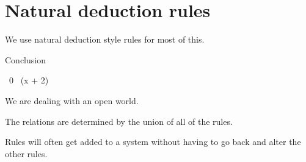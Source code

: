 
\section{Natural deduction rules}

\begin{frame}[c]
  We use natural deduction style rules for most of this.
\end{frame}

\begin{frame}
          {Conclusion}
\end{frame}

\begin{frame}
          {~0}
          {~\left(x + 2\right)}
\end{frame}

\begin{frame}[c]
  We are dealing with an open world.
\end{frame}

\begin{frame}[c]
  The relations are determined by the union of all of the rules.
\end{frame}

\begin{frame}[c]
  Rules will often get added to a system without having to go back and alter the
  other rules.
\end{frame}
